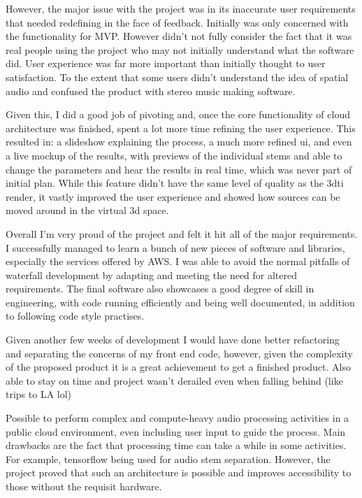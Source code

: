 However,
the major issue with the project was in its inaccurate user requirements that needed redefining in the face of feedback.
Initially was only concerned with the functionality for MVP.
However didn't not fully consider the fact
that it was real people using the project who may not initially understand what the software did.
User experience was far more important than initially thought to user satisfaction.
To the extent that some users didn't understand the idea of spatial audio
and confused the product with stereo music making software.

Given this, I did a good job of pivoting and, once the core functionality of cloud architecture was finished,
spent a lot more time refining the user experience.
This resulted in: a slideshow explaining the process, a much more refined ui, and even a live mockup of the results,
with previews of the individual stems and able to change the parameters and hear the results in real time,
which was never part of initial plan.
While this feature didn't have the same level of quality as the 3dti render,
it vastly improved the user experience and showed how sources can be moved around in the virtual 3d space.

Overall I'm very proud of the project and felt it hit all of the major requirements.
I successfully managed to learn a bunch of new pieces of software and libraries, especially the services offered by AWS.
I was able
to avoid the normal pitfalls of waterfall development by adapting and meeting the need for altered requirements.
The final software also showcases a good degree of skill in engineering,
with code running efficiently and being well documented, in addition to following code style practises.

Given another few weeks of development I would have done better
refactoring and separating the concerns of my front end code,
however, given the complexity of the proposed product it is a great achievement to get a finished product.
Also able to stay on time and project wasn't derailed even when falling behind (like trips to LA lol)

Possible to perform complex and compute-heavy audio processing activities in a public cloud environment,
even including user input to guide the process.
Main drawbacks are the fact that processing time can take a while in some activities.
For example, tensorflow being used for audio stem separation.
However,
the project proved that such an architecture is possible
and improves accessibility to those without the requisit hardware.

